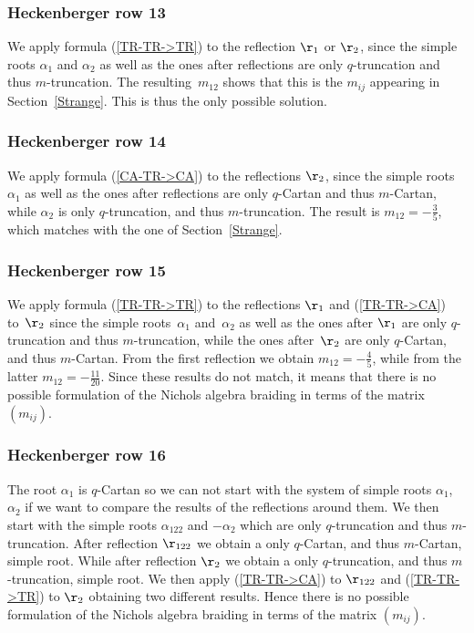 \documentclass[pdftex]{sigma}%
\numberwithin{equation}{section}
\begin{document}
\subsubsection*{Heckenberger row 13}
We apply formula (\ref{TR-TR->TR}) to the reflection $\r_1$ or $\r_2$, since the simple roots $\alpha_1$ and $\alpha_2$ as well as the ones after reflections are only $q$-truncation and thus $m$-truncation. The resulting~$m_{12}$ shows that this is the $m_{ij}$ appearing in Section~\ref{Strange}. This is thus the only possible solution.

\subsubsection*{Heckenberger row 14}
We apply formula (\ref{CA-TR->CA}) to the reflections $\r_2$, since the simple roots $\alpha_1$ as well as the ones after reflections are only $q$-Cartan and thus $m$-Cartan, while $\alpha_2$ is only $q$-truncation, and thus $m$-truncation. The result is $m_{12}=-\frac{3}{5}$, which matches with the one of Section~\ref{Strange}.

\subsubsection*{Heckenberger row 15}
We apply formula (\ref{TR-TR->TR}) to the reflections $\r_1$ and (\ref{TR-TR->CA}) to~$\r_2$ since the simple roots~$\alpha_1$ and~$\alpha_2$ as well as the ones after $\r_1$ are only $q$-truncation and thus $m$-truncation, while the ones after~$\r_2$ are only $q$-Cartan, and thus $m$-Cartan. From the first reflection we obtain $m_{12}=-\frac{4}{5}$, while from the latter $m_{12}=-\frac{11}{20}$. Since these results do not match, it means that there is no possible formulation of the Nichols algebra braiding in terms of the matrix~$(m_{ij})$.

\subsubsection*{Heckenberger row 16}
The root $\alpha_1$ is $q$-Cartan so we can not start with the system of simple roots $\alpha_1$, $\alpha_2$ if we want to compare the results of the reflections around them.
We then start with the simple roots $\alpha_{122}$ and $-\alpha_2$ which are only $q$-truncation and thus $m$-truncation.
After reflection $\r_{122}$ we obtain a only $q$-Cartan, and thus $m$-Cartan, simple root. While after reflection $\r_{2}$ we obtain a only $q$-truncation, and thus $m$-truncation, simple root. We then apply (\ref{TR-TR->CA}) to $\r_{122}$ and (\ref{TR-TR->TR}) to $\r_{2}$ obtaining two different results. Hence there is no possible formulation of the Nichols algebra braiding in terms of the matrix $(m_{ij})$.
\end{document}
